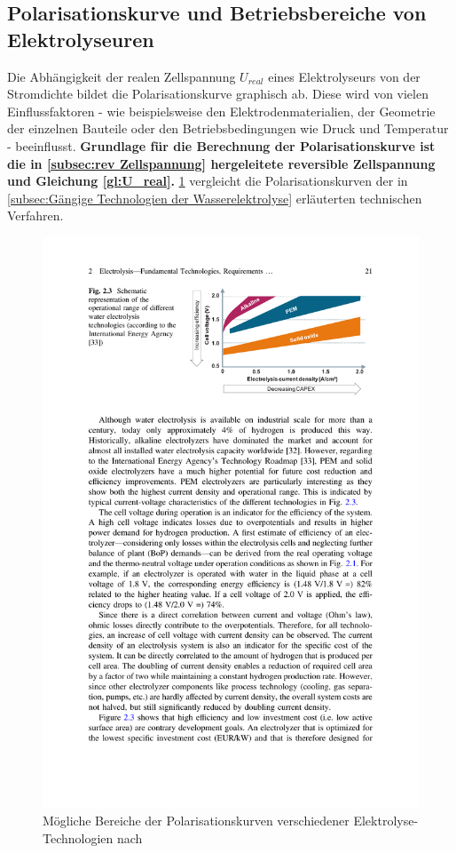 \subsection{Polarisationskurve und Betriebsbereiche von Elektrolyseuren}
\label{subsec:Polarisationskurve}
Die Abhängigkeit der realen Zellspannung $U_{real}$ eines Elektrolyseurs von der Stromdichte bildet die Polarisationskurve graphisch ab. Diese wird von vielen Einflussfaktoren - wie beispielsweise den Elektrodenmaterialien, der Geometrie der einzelnen Bauteile oder den Betriebsbedingungen wie Druck und Temperatur - beeinflusst. \textbf{Grundlage für die Berechnung der Polarisationskurve ist die in \ref{subsec:rev Zellspannung} hergeleitete reversible Zellspannung und Gleichung \ref{gl:U_real}.} \ref{fig:PolarisationskurveElektrolyseure} vergleicht die Polarisationskurven der in \ref{subsec:Gängige Technologien der Wasserelektrolyse} erläuterten technischen Verfahren. 
\begin{figure}[h]
	\centering
		\includegraphics[scale=1]{Figures/PolarisationskurvenElektrolyseure}
		\caption{Mögliche Bereiche der Polarisationskurven verschiedener Elektrolyse-Technologien nach \cite{https://doi.org/10.1007/978-3-319-72459-1}}
\label{fig:PolarisationskurveElektrolyseure}	
\end{figure}

